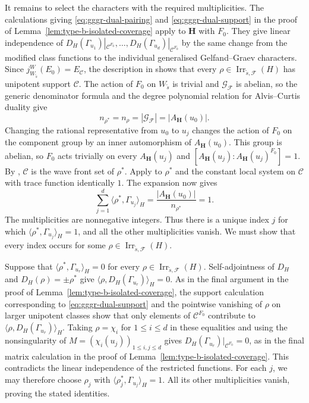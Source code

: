 \documentclass[10pt]{amsart}
\theoremstyle{definition}
\renewcommand{\leq}{\leqslant}
\let\oldendproof\endproof
\renewenvironment{proof}[1][\proofname]{%
  \oldproof[\bfseries #1]%
}{\oldendproof}
\DeclareMathOperator{\Irr}{Irr}
\numberwithin{equation}{section}
\numberwithin{table}{section}
\begin{document}
\begin{proof}[Proof of Lemma~\ref{lem:symplectic-gggr-selection}]
It remains to select the characters with the required multiplicities.
The calculations giving \eqref{eq:gggr-dual-pairing} and
\eqref{eq:gggr-dual-support} in the proof of
Lemma~\ref{lem:type-b-isolated-coverage} apply to $\mathbf H$ with $F_0$.
They give linear independence of
$D_H(\Gamma_{u_1})|_{\mathcal C^{F_0}},\ldots,
D_H(\Gamma_{u_d})|_{\mathcal C^{F_0}}$ by the same change from the modified
class functions to the individual generalised Gelfand--Graev characters.
Since $j_{W_{\widetilde s}}^W(E_0)=E_{\mathcal C}$, the description in
\cite[Section~3(C) and Theorem~3.7]{GeckMalle2000} shows that every
$\rho\in\Irr_{\widetilde s,\mathcal F}(H)$ has unipotent support $\mathcal C$.
The action of $F_0$ on $W_{\widetilde s}$ is trivial and
$\mathcal G_{\mathcal F}$ is abelian, so the generic denominator formula
\cite[(6.1)(c)]{Geck1999GGGR} and the degree polynomial relation
for Alvis--Curtis duality \cite[Proposition~3.4.21]{GeckMalle2020} give
\[
 n_{\rho^*}=n_\rho
 =|\mathcal G_{\mathcal F}|=|A_{\mathbf H}(u_0)|.
\]
Changing the rational representative from $u_0$ to $u_j$ changes the
action of $F_0$ on the component group by an inner automorphism of
$A_{\mathbf H}(u_0)$. This group is abelian, so $F_0$ acts trivially
on every $A_{\mathbf H}(u_j)$ and
$[A_{\mathbf H}(u_j):A_{\mathbf H}(u_j)^{F_0}]=1$.
By \cite[Lemma~14.15]{Taylor2016}, $\mathcal C$ is the wave front set of
$\rho^*$. Apply \cite[Proposition~15.4]{Taylor2016} to $\rho^*$ and the
constant local system on $\mathcal C$ with trace function identically $1$.
The expansion \cite[(11.15)]{Taylor2016} now gives
\[
 \sum_{j=1}^{d}\langle\rho^*,\Gamma_{u_j}\rangle_H
 =\frac{|A_{\mathbf H}(u_0)|}{n_{\rho^*}}=1.
\]
The multiplicities are nonnegative integers. Thus there is a unique index
$j$ for which $\langle\rho^*,\Gamma_{u_j}\rangle_H=1$, and all the other
multiplicities vanish. We must show that every index occurs for some
$\rho\in\Irr_{\widetilde s,\mathcal F}(H)$.

Suppose that $\langle\rho^*,\Gamma_{u_r}\rangle_H=0$ for every
$\rho\in\Irr_{\widetilde s,\mathcal F}(H)$.
Self-adjointness of $D_H$ and $D_H(\rho)=\pm\rho^*$ give
$\langle\rho,D_H(\Gamma_{u_r})\rangle_H=0$.
As in the final argument in the proof of
Lemma~\ref{lem:type-b-isolated-coverage}, the support calculation
corresponding to \eqref{eq:gggr-dual-support} and the pointwise vanishing of
$\rho$ on larger unipotent classes show that only elements of $\mathcal
C^{F_0}$ contribute to $\langle\rho,D_H(\Gamma_{u_r})\rangle_H$.
Taking $\rho=\chi_i$ for $1\leq i\leq d$ in these equalities and using the
nonsingularity of $M=(\chi_i(u_j))_{1\leq i,j\leq d}$ gives
$D_H(\Gamma_{u_r})|_{\mathcal C^{F_0}}=0$, as in the final matrix calculation
in the proof of Lemma~\ref{lem:type-b-isolated-coverage}.
This contradicts the linear independence of the restricted functions.
For each $j$, we may therefore choose $\rho_j$ with
$\langle\rho_j^*,\Gamma_{u_j}\rangle_H=1$.
All its other multiplicities vanish, proving the stated identities.
\end{proof}
\end{document}
